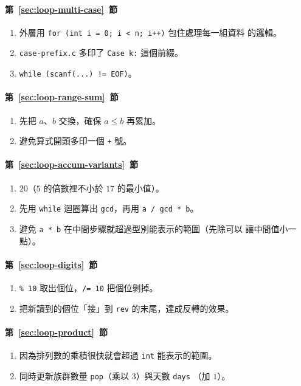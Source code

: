 \paragraph{第~\ref{sec:loop-multi-case}~節}
\begin{enumerate}
\item 外層用 \texttt{for (int i = 0; i < n; i++)} 包住處理每一組資料
的邏輯。
\item \texttt{case-prefix.c} 多印了 \texttt{Case k:} 這個前綴。
\item \texttt{while (scanf(...) != EOF)}。
\end{enumerate}

\paragraph{第~\ref{sec:loop-range-sum}~節}
\begin{enumerate}
\item 先把 $a$、$b$ 交換，確保 $a \le b$ 再累加。
\item 避免算式開頭多印一個 \texttt{+} 號。
\end{enumerate}

\paragraph{第~\ref{sec:loop-accum-variants}~節}
\begin{enumerate}
\item $20$（$5$ 的倍數裡不小於 $17$ 的最小值）。
\item 先用 \texttt{while} 迴圈算出 \texttt{gcd}，再用
\texttt{a / gcd * b}。
\item 避免 \texttt{a * b} 在中間步驟就超過型別能表示的範圍（先除可以
讓中間值小一點）。
\end{enumerate}

\paragraph{第~\ref{sec:loop-digits}~節}
\begin{enumerate}
\item \texttt{\% 10} 取出個位，\texttt{/= 10} 把個位剝掉。
\item 把新讀到的個位「接」到 \texttt{rev} 的末尾，達成反轉的效果。
\end{enumerate}

\paragraph{第~\ref{sec:loop-product}~節}
\begin{enumerate}
\item 因為排列數的乘積很快就會超過 \texttt{int} 能表示的範圍。
\item 同時更新族群數量 \texttt{pop}（乘以 $3$）與天數 \texttt{days}
（加 $1$）。
\end{enumerate}

